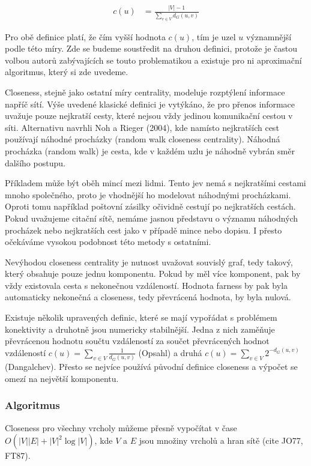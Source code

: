 \documentclass[12pt,titlepage]{report}
\begin{document}
\begin{align*}
c(u) &= \frac{|V| - 1}{\sum_{v \in V} d_G(u, v)}
\end{align*}

Pro obě definice platí, že čím vyšší hodnota $c(u)$, tím je uzel $u$
významnější podle této míry. Zde se budeme soustředit na druhou definici,
protože je častou volbou autorů zabývajících se touto problematikou a existuje
pro ni aproximační algoritmus, který si zde uvedeme.

Closeness, stejně jako ostatní míry centrality, modeluje rozptýlení informace
napříč sítí. Výše uvedené klasické definici je vytýkáno, že pro přenos
informace uvažuje pouze nejkratší cesty, které nejsou vždy jedinou komunikační
cestou v síti. Alternativu navrhli Noh a Rieger (2004), kde namísto nejkratších
cest používají náhodné procházky (random walk closeness centrality). Náhodná
procházka (random walk) je cesta, kde v každém uzlu je náhodně vybrán směr
dalšího postupu.

Příkladem může být oběh mincí mezi lidmi. Tento jev nemá s nejkratšími cestami
mnoho společného, proto je vhodnější ho modelovat náhodnými procházkami. Oproti
tomu například poštovní zásilky očividně cestují po nejkratších cestách. Pokud
uvažujeme citační sítě, nemáme jasnou představu o významu náhodných procházek
nebo nejkratších cest jako v případě mince nebo dopisu. I přesto očekáváme
vysokou podobnost této metody s ostatními.

Nevýhodou closeness centrality je nutnost uvažovat souvislý graf, tedy takový,
který obsahuje pouze jednu komponentu. Pokud by měl více komponent, pak by vždy
existovala cesta s nekonečnou vzdáleností. Hodnota farness by pak byla
automaticky nekonečná a closeness, tedy převrácená hodnota, by byla nulová. 

Existuje několik upravených definic, které se mají vypořádat s problémem
konektivity a druhotně jsou numericky stabilnější. Jedna z nich zaměňuje
převrácenou hodnotu součtu vzdáleností za součet převrácených hodnot
vzdáleností $c(u) = \sum_{v \in V} \frac{1}{d_G(u, v)}$ (Opsahl) a druhá $c(u)
= \sum_{v \in V} 2^{-d_G(u, v)}$ (Dangalchev). Přesto se nejvíce používá
původní definice closeness a výpočet se omezí na největší komponentu.


\subsubsection{Algoritmus}
Closeness pro všechny vrcholy můžeme přesně vypočítat v čase $O(|V||E| +
|V|^2\log|V|)$, kde $V$ a $E$ jsou množiny vrcholů a hran sítě (cite JO77,
FT87). 
\end{document}
